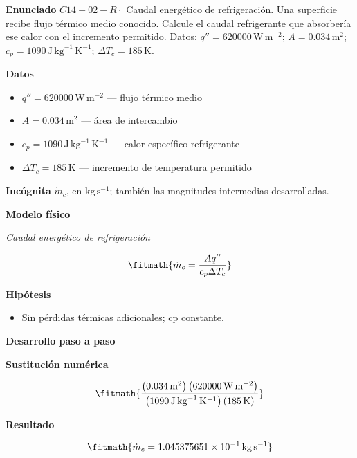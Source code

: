 \documentclass[10pt,openany]{book}
\begin{document}
\begin{tcolorbox}[title={Problema resuelto 2}, studiumworked, breakable]

\noindent\textbf{Enunciado}
\(C14-02-R \cdot\) Caudal energético de refrigeración. Una superficie recibe flujo térmico medio conocido. Calcule el caudal refrigerante que absorbería ese calor con el incremento permitido. Datos: \(q''=620000\, \mathrm{W}\,\mathrm{m}^{-2}\); \(A=0.034\, \mathrm{m}^{2}\); \(c_p=1090\, \mathrm{J}\,\mathrm{kg}^{-1}\,\mathrm{K}^{-1}\); \(\Delta T_c=185\, \mathrm{K}\).

\noindent\textbf{Datos}
\begin{itemize}
\item $q'' = 620000\,\mathrm{W}\,\mathrm{m}^{-2}$ — flujo térmico medio
\item $A = 0.034\,\mathrm{m}^{2}$ — área de intercambio
\item $c_p = 1090\,\mathrm{J}\,\mathrm{kg}^{-1}\,\mathrm{K}^{-1}$ — calor específico refrigerante
\item $\Delta T_c = 185\,\mathrm{K}$ — incremento de temperatura permitido
\end{itemize}

\noindent\textbf{Incógnita}
$\dot{m}_c$, en $\mathrm{kg\,s^{-1}}$; también las magnitudes intermedias desarrolladas.

\noindent\textbf{Modelo físico}

\noindent\textit{Caudal energético de refrigeración}

\[
\fitmath{\dot{m}_c=\frac{A q''}{c_p \Delta T_c}}
\]

\noindent\textbf{Hipótesis}
\begin{itemize}
\item Sin pérdidas térmicas adicionales; cp constante.
\end{itemize}

\noindent\textbf{Desarrollo paso a paso}



\noindent\textbf{Sustitución numérica}

\[
\fitmath{\frac{\left(0.034\,\mathrm{m}^{2}\right) \left(620000\,\mathrm{W}\,\mathrm{m}^{-2}\right)}{\left(1090\,\mathrm{J}\,\mathrm{kg}^{-1}\,\mathrm{K}^{-1}\right) \left(185\,\mathrm{K}\right)}}
\]

\noindent\textbf{Resultado}

\[
\fitmath{\dot{m}_c=1.045375651\times10^{-1}\,\mathrm{kg}\,\mathrm{s}^{-1}}
\]


\end{tcolorbox}
\end{document}

